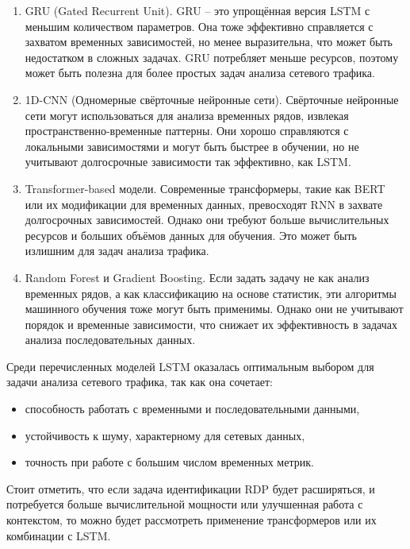 \documentclass[bachelor, och, coursework]{SCWorks}
\begin{document}
  \begin{enumerate}
    \item GRU (Gated Recurrent Unit). GRU -- это упрощённая версия LSTM с меньшим количеством параметров. Она тоже эффективно справляется 
    с захватом временных зависимостей, но менее выразительна, что может быть недостатком в сложных задачах. GRU потребляет меньше ресурсов, 
    поэтому может быть полезна для более простых задач анализа сетевого трафика.  

    \item 1D-CNN (Одномерные свёрточные нейронные сети). Свёрточные нейронные сети могут использоваться для анализа временных рядов, 
    извлекая пространственно-временные паттерны. Они хорошо справляются с локальными зависимостями и могут быть быстрее в обучении, 
    но не учитывают долгосрочные зависимости так эффективно, как LSTM.  

    \item Transformer-based модели. Современные трансформеры, такие как BERT или их модификации для временных данных, превосходят RNN 
    в захвате долгосрочных зависимостей. Однако они требуют больше вычислительных ресурсов и больших объёмов данных для обучения. Это 
    может быть излишним для задач анализа трафика.  

    \item Random Forest и Gradient Boosting. Если задать задачу не как анализ временных рядов, а как классификацию на основе статистик,
    эти алгоритмы машинного обучения тоже могут быть применимы. Однако они не учитывают порядок и временные зависимости, что снижает их
    эффективность в задачах анализа последовательных данных.  
  \end{enumerate}


  Среди перечисленных моделей LSTM оказалась оптимальным выбором для задачи анализа сетевого трафика, так как она сочетает:
  \begin{itemize}
    \item способность работать с временными и последовательными данными,  
    \item устойчивость к шуму, характерному для сетевых данных,  
    \item точность при работе с большим числом временных метрик.  
  \end{itemize}

  Стоит отметить, что если задача идентификации RDP будет расширяться, и потребуется больше вычислительной мощности или улучшенная работа с контекстом, 
  то можно будет рассмотреть применение трансформеров или их комбинации с LSTM.
\end{document}
